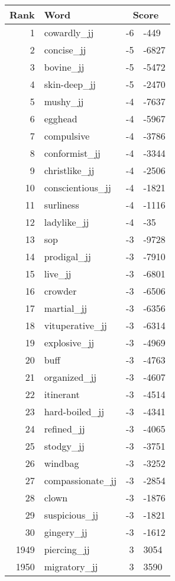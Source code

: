 \begin{longtable}[!htbp]{| rlr@{.}l |}
    \hline
    \textbf{Rank} & \textbf{Word} & \multicolumn{2}{c|}{\textbf{Score}} \\
    \hline
    \endhead
    1 & cowardly\_jj & -6 & -449 \\
    2 & concise\_jj & -5 & -6827 \\
    3 & bovine\_jj & -5 & -5472 \\
    4 & skin-deep\_jj & -5 & -2470 \\
    5 & mushy\_jj & -4 & -7637 \\
    6 & egghead & -4 & -5967 \\
    7 & compulsive & -4 & -3786 \\
    8 & conformist\_jj & -4 & -3344 \\
    9 & christlike\_jj & -4 & -2506 \\
    10 & conscientious\_jj & -4 & -1821 \\
    11 & surliness & -4 & -1116 \\
    12 & ladylike\_jj & -4 & -35 \\
    13 & sop & -3 & -9728 \\
    14 & prodigal\_jj & -3 & -7910 \\
    15 & live\_jj & -3 & -6801 \\
    16 & crowder & -3 & -6506 \\
    17 & martial\_jj & -3 & -6356 \\
    18 & vituperative\_jj & -3 & -6314 \\
    19 & explosive\_jj & -3 & -4969 \\
    20 & buff & -3 & -4763 \\
    21 & organized\_jj & -3 & -4607 \\
    22 & itinerant & -3 & -4514 \\
    23 & hard-boiled\_jj & -3 & -4341 \\
    24 & refined\_jj & -3 & -4065 \\
    25 & stodgy\_jj & -3 & -3751 \\
    26 & windbag & -3 & -3252 \\
    27 & compassionate\_jj & -3 & -2854 \\
    28 & clown & -3 & -1876 \\
    29 & suspicious\_jj & -3 & -1821 \\
    30 & gingery\_jj & -3 & -1612 \\
    1949 & piercing\_jj & 3 & 3054 \\
    1950 & migratory\_jj & 3 & 3590 \\

\end{longtable}
